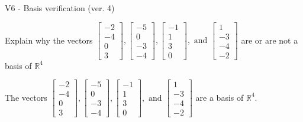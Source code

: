 \begin{exercise}
  \begin{exerciseTitle}V6 - Basis verification (ver. 4)\end{exerciseTitle}
  \begin{exerciseStatement}
    Explain why the vectors \(\left[\begin{array}{r}
-2 \\
-4 \\
0 \\
3
\end{array}\right] , \left[\begin{array}{r}
-5 \\
0 \\
-3 \\
-4
\end{array}\right] , \left[\begin{array}{r}
-1 \\
1 \\
3 \\
0
\end{array}\right] , \text{ and } \left[\begin{array}{r}
1 \\
-3 \\
-4 \\
-2
\end{array}\right]\) are or are not a basis of \(\mathbb{R}^4\)	


  \end{exerciseStatement}
  \begin{exerciseAnswer}
   The vectors \(\left[\begin{array}{r}
-2 \\
-4 \\
0 \\
3
\end{array}\right] , \left[\begin{array}{r}
-5 \\
0 \\
-3 \\
-4
\end{array}\right] , \left[\begin{array}{r}
-1 \\
1 \\
3 \\
0
\end{array}\right] , \text{ and } \left[\begin{array}{r}
1 \\
-3 \\
-4 \\
-2
\end{array}\right]\) 
  	 are  a basis of \(\mathbb{R}^4\).
  


  \end{exerciseAnswer}
\end{exercise}